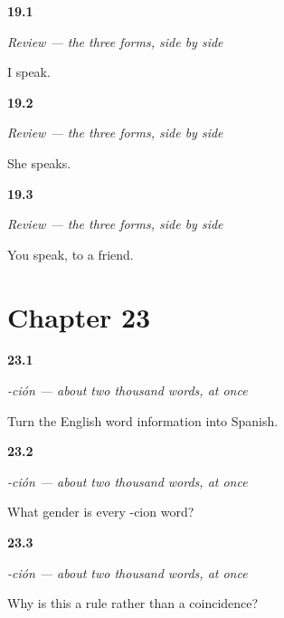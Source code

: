 \noindent\begin{minipage}[t]{\linewidth}
\raggedright
\hypertarget{review-ES-C06-ar-presente-mix-1}{\textbf{19.1}} \emph{Review — the three forms, side by side}\par
\small I speak.
\end{minipage}\par\medskip

\noindent\begin{minipage}[t]{\linewidth}
\raggedright
\hypertarget{review-ES-C06-ar-presente-mix-2}{\textbf{19.2}} \emph{Review — the three forms, side by side}\par
\small She speaks.
\end{minipage}\par\medskip

\noindent\begin{minipage}[t]{\linewidth}
\raggedright
\hypertarget{review-ES-C06-ar-presente-mix-3}{\textbf{19.3}} \emph{Review — the three forms, side by side}\par
\small You speak, to a friend.
\end{minipage}\par\medskip

\section*{Chapter 23}

\noindent\begin{minipage}[t]{\linewidth}
\raggedright
\hypertarget{review-ES-C56-cion-make}{\textbf{23.1}} \emph{-ción — about two thousand words, at once}\par
\small Turn the English word information into Spanish.
\end{minipage}\par\medskip

\noindent\begin{minipage}[t]{\linewidth}
\raggedright
\hypertarget{review-ES-C56-cion-gender}{\textbf{23.2}} \emph{-ción — about two thousand words, at once}\par
\small What gender is every -cion word?
\end{minipage}\par\medskip

\noindent\begin{minipage}[t]{\linewidth}
\raggedright
\hypertarget{review-ES-C56-cion-why}{\textbf{23.3}} \emph{-ción — about two thousand words, at once}\par
\small Why is this a rule rather than a coincidence?
\end{minipage}\par\medskip


